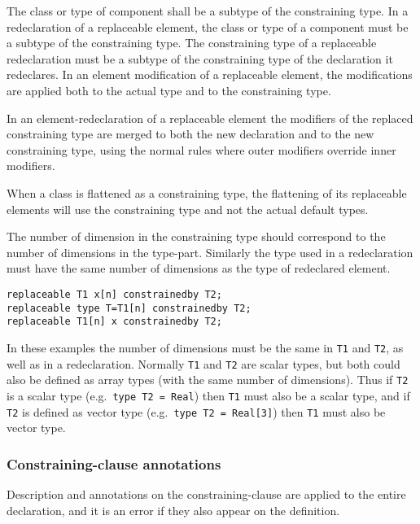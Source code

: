 The class or type of component shall be a subtype of the constraining
type. In a redeclaration of a replaceable element, the class or type of
a component must be a subtype of the constraining type. The constraining
type of a replaceable redeclaration must be a subtype of the
constraining type of the declaration it redeclares. In an element
modification of a replaceable element, the modifications are applied
both to the actual type and to the constraining type.

In an element-redeclaration of a replaceable element the modifiers of
the replaced constraining type are merged to both the new declaration
and to the new constraining type, using the normal rules where outer
modifiers override inner modifiers.

When a class is flattened as a constraining type, the flattening of its
replaceable elements will use the constraining type and not the actual
default types.

The number of dimension in the constraining type should correspond to
the number of dimensions in the type-part. Similarly the type used in a
redeclaration must have the same number of dimensions as the type of
redeclared element.

\begin{example}
\begin{lstlisting}[language=modelica]
replaceable T1 x[n] constrainedby T2;
replaceable type T=T1[n] constrainedby T2;
replaceable T1[n] x constrainedby T2;
\end{lstlisting}
In these examples the number of dimensions must be the same in \lstinline!T1! and \lstinline!T2!, as well as in a redeclaration.  Normally \lstinline!T1! and \lstinline!T2! are scalar types, but both
could also be defined as array types (with the same number of dimensions).  Thus if \lstinline!T2! is a scalar type (e.g.\ \lstinline!type T2 = Real!) then \lstinline!T1! must also be a scalar type,
and if \lstinline!T2! is defined as vector type (e.g.\ \lstinline!type T2 = Real[3]!) then \lstinline!T1! must also be vector type.
\end{example}

\subsubsection{Constraining-clause annotations}\label{constraining-clause-annotations}

Description and annotations on the constraining-clause are applied to
the entire declaration, and it is an error if they also appear on the
definition.

